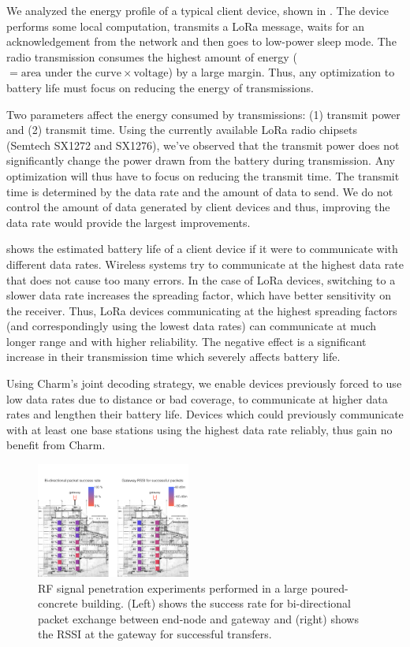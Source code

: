 We analyzed the energy profile of a typical client device, shown in . The device performs some local computation, transmits a LoRa message, waits for an acknowledgement from the network and then goes to low-power sleep mode. The radio transmission consumes the highest amount of energy ($= \text{area under the curve} \times \text{voltage}$) by a large margin. Thus, any optimization to battery life must focus on reducing the energy of transmissions.

Two parameters affect the energy consumed by transmissions: (1) transmit power and (2) transmit time. Using the currently available LoRa radio chipsets (Semtech SX1272 and SX1276), we've observed that the transmit power does not significantly change the power drawn from the battery during transmission. Any optimization will thus have to focus on reducing the transmit time. The transmit time is determined by the data rate and the amount of data to send. We do not control the amount of data generated by client devices and thus, improving the data rate would provide the largest improvements.

 shows the estimated battery life of a client device if it were to communicate with different data rates. Wireless systems try to communicate at the highest data rate that does not cause too many errors. In the case of LoRa devices, switching to a slower data rate increases the spreading factor,  which have better sensitivity on the receiver. Thus, LoRa devices communicating at the highest spreading factors (and correspondingly using the lowest data rates) can communicate at much longer range and with higher reliability. The negative effect is a significant increase in their transmission time which severely affects battery life.

Using Charm's joint decoding strategy, we enable devices previously forced to use low data rates due to distance or bad coverage, to communicate at higher data rates and lengthen their battery life. Devices which could previously communicate with at least one base stations using the highest data rate reliably, thus gain no benefit from Charm.

\begin{figure}[!ht]
\centering
\includegraphics[width=0.45\textwidth]{figures/penetration_test_wean_cropped}
\compactimg
\caption{RF signal penetration experiments performed in a large poured-concrete building. (Left) shows the success rate for bi-directional packet exchange between end-node and gateway and (right) shows the RSSI at the gateway for successful transfers.}
\label{fig:penetration-test}
\end{figure}

